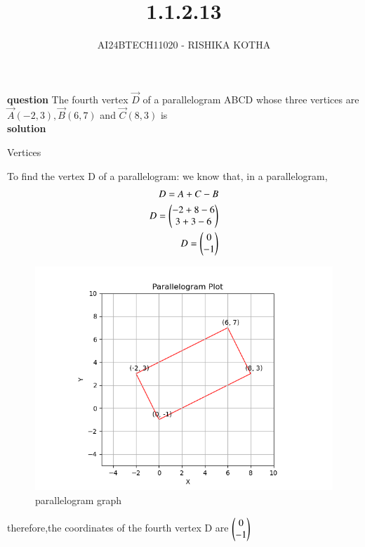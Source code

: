 \documentclass[journal]{IEEEtran}
\begin{document}

\vspace{3cm}

\title{1.1.2.13}
\author{AI24BTECH11020 - RISHIKA KOTHA}
{\let\newpage\relax\maketitle}

\renewcommand{\thefigure}{\theenumi}
\renewcommand{\thetable}{\theenumi}
\setlength{\intextsep}{10pt} %


\renewcommand{\thetable}{\theenumi}

\textbf{question}
The fourth vertex $\vec{D}$ of a parallelogram ABCD whose three vertices are $\vec{A}(-2, 3),\vec{B}(6, 7)$ and $\vec{C}(8, 3)$ is
\\
\textbf{solution}
\begin{table}[h!]    
  \centering
  
  \caption{Vertices}
  \label{tab1.2.13.1}
\end{table}
 
To find the vertex D of a parallelogram:
we know that, in a parallelogram,
\begin{align}
	D=A+C-B\\
        D=\begin{pmatrix}-2+8-6\\3+3-6\end{pmatrix}\\
	D=\begin{pmatrix}0\\-1\end{pmatrix}\\
\end{align}
\begin{figure}[h!]
   \centering
   \includegraphics[width=0.7\linewidth]{fig/Figure_1.png}
   \caption{parallelogram graph}
   \label{parallelogram graph}
\end{figure}
therefore,the coordinates of the fourth vertex D are $\begin{pmatrix}0\\-1\end{pmatrix}$\\
\end{document}
